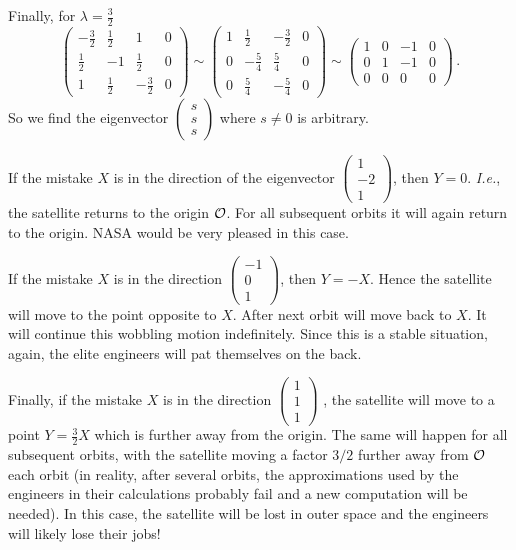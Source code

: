 \begin{enumerate}
\begin{enumerate}
Finally, for $\lambda=\frac32$
\[
\left(
\begin{array}{ccc|c}
-\frac32&\frac12&1&0\\[1mm]
\frac12&-1&\frac12&0\\[1mm]
1&\frac12&-\frac32&0
\end{array}\right)
\sim
\left(
\begin{array}{ccc|c}
1&\frac12&-\frac32&0\\[1mm]
0&-\frac54&\frac54&0\\[1mm]
0&\frac54&-\frac54&0
\end{array}\right)
\sim
\left(
\begin{array}{ccc|c}
1&0&-1&0\\[1mm]
0&1&-1&0\\[1mm]
0&0&0&0
\end{array}\right)\, .
\]
So we find the eigenvector $\begin{pmatrix}s\\s\\s\end{pmatrix}$ where $s\neq 0$ is arbitrary.
\end{enumerate}
If the mistake $X$ is in the direction of the eigenvector $\begin{pmatrix}1\\-2\\1\end{pmatrix}$,
then $Y=0$. {\itshape I.e.}, the satellite returns to the origin ${\cal O}$. For all subsequent orbits it will again return to 
the origin. NASA would be very pleased in this case.

If the mistake $X$ is in the direction $\begin{pmatrix}-1\\0\\1\end{pmatrix}$, then $Y=-X$. Hence the satellite will move to the point opposite to $X$. After next orbit will move back to $X$. It will continue this wobbling
motion indefinitely. Since this is a stable situation, again, the elite engineers will pat themselves on the back.

Finally, if the mistake  $X$ is in the direction $\begin{pmatrix}1\\1\\1\end{pmatrix}$ , the satellite will move
to a point $Y=\frac32 X$ which is further away from the origin. The same will happen for all subsequent
orbits, with the satellite moving a factor $3/2$ further away from ${\cal O}$ each orbit (in reality, after
several orbits, the approximations used by the engineers in their calculations probably fail and a new computation  will be needed). In this case, the satellite will be lost in outer space and the engineers will likely lose their jobs!


\end{enumerate}
